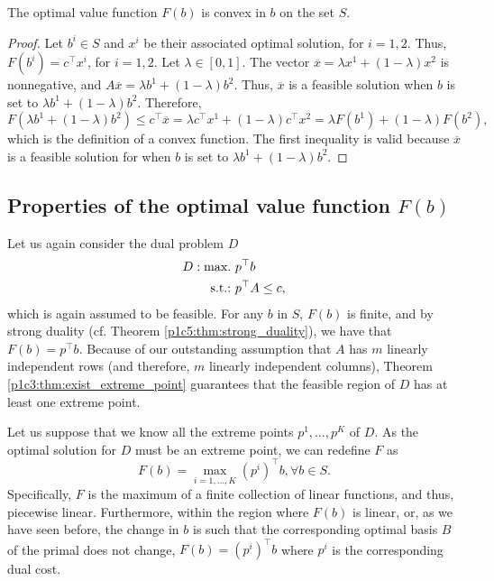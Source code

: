 \begin{theorem}[Convexity of $F(b)$]
	The optimal value function $F(b)$ is convex in $b$ on the set $S$.
\end{theorem}

\begin{proof}

	Let $b^i \in S$ and $x^i$ be their associated optimal solution, for $i = 1,2$. Thus, $F(b^i) = c^\top x^i$, for $i=1,2$. Let $\lambda \in [0,1]$. The vector $\overline{x} = \lambda x^1 + (1-\lambda)x^2$ is nonnegative, and $A\overline{x} = \lambda b^1 + (1-\lambda)b^2$. Thus, $\overline{x}$ is a feasible solution when $b$ is set to $\lambda b^1 + (1-\lambda)b^2$. Therefore,
	\begin{equation*}
		F(\lambda b^1 + (1-\lambda)b^2) \le c^\top \overline{x}	= \lambda c^\top x^1 + (1-\lambda) c^\top x^2 = \lambda F(b^1) + (1-\lambda) F(b^2),
	\end{equation*}
	which is the definition of a convex function. The first inequality is valid because $\overline{x}$ is a feasible solution for when $b$ is set to $\lambda b^1 + (1-\lambda)b^2$.
\end{proof}


\subsection{Properties of the optimal value function $F(b)$} \label{section_732}

Let us again consider the dual problem $D$
%
\begin{align*}
	D: \mathop{\text{max.~}} & p^\top b \\
	\mathop{\text{s.t.:~}}   & p^\top A \le c,
\end{align*}
%
which is again assumed to be feasible. For any $b$ in $S$, $F(b)$ is finite, and by strong duality (cf. Theorem \ref{p1c5:thm:strong_duality}), we have that $F(b) = p^\top b$. Because of our outstanding assumption that $A$ has $m$ linearly independent rows (and therefore, $m$ linearly independent columns), Theorem \ref{p1c3:thm:exist_extreme_point} guarantees that the feasible region of $D$ has at least one extreme point.

Let us suppose that we know all the extreme points $p^1, \dots, p^K$ of $D$. As the optimal solution for $D$ must be an extreme point, we can redefine $F$ as
%
\begin{equation} \label{p1c7:eq:function_F}
	F(b) = \max_{i = 1, \dots, K} (p^i)^\top b, \forall b \in S.
\end{equation}
%
Specifically, $F$ is the maximum of a finite collection of linear functions, and thus, piecewise linear. Furthermore, within the region where $F(b)$ is linear, or, as we have seen before, the change in $b$ is such that the corresponding optimal basis $B$ of the primal does not change, $F(b) = (p^i)^\top b$ where $p^i$ is the corresponding dual cost.

